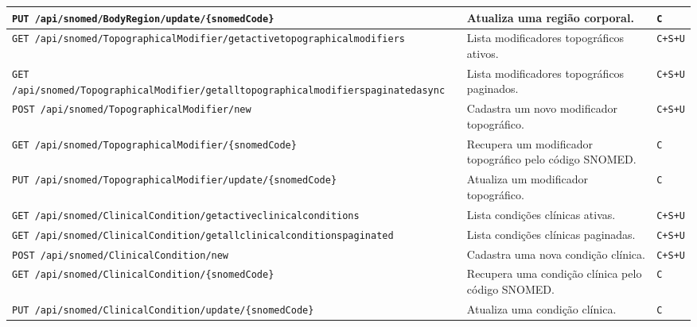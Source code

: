\begin{longtable}{|p{}|p{}|p{}|}
\texttt{PUT /api/snomed/BodyRegion/\newline update/\{snomedCode\}} & Atualiza uma região corporal. & \texttt{C} \\ \hline
\texttt{GET /api/snomed/\newline TopographicalModifier/\newline getactivetopographicalmodifiers} & Lista modificadores topográficos ativos. & \texttt{C+S+U} \\ \hline
\texttt{GET /api/snomed/\newline TopographicalModifier/\newline getalltopographicalmodifierspaginatedasync} & Lista modificadores topográficos paginados. & \texttt{C+S+U} \\ \hline
\texttt{POST /api/snomed/\newline TopographicalModifier/new} & Cadastra um novo modificador topográfico. & \texttt{C+S+U} \\ \hline
\texttt{GET /api/snomed/\newline TopographicalModifier/\{snomedCode\}} & Recupera um modificador topográfico pelo código SNOMED. & \texttt{C} \\ \hline
\texttt{PUT /api/snomed/\newline TopographicalModifier/update/\newline \{snomedCode\}} & Atualiza um modificador topográfico. & \texttt{C} \\ \hline
\texttt{GET /api/snomed/ClinicalCondition/\newline getactiveclinicalconditions} & Lista condições clínicas ativas. & \texttt{C+S+U} \\ \hline
\texttt{GET /api/snomed/ClinicalCondition/\newline getallclinicalconditionspaginated} & Lista condições clínicas paginadas. & \texttt{C+S+U} \\ \hline
\texttt{POST /api/snomed/ClinicalCondition/\newline new} & Cadastra uma nova condição clínica. & \texttt{C+S+U} \\ \hline
\texttt{GET /api/snomed/ClinicalCondition/\newline \{snomedCode\}} & Recupera uma condição clínica pelo código SNOMED. & \texttt{C} \\ \hline
\texttt{PUT /api/snomed/ClinicalCondition/\newline update/\{snomedCode\}} & Atualiza uma condição clínica. & \texttt{C} \\ \hline
\end{longtable}

